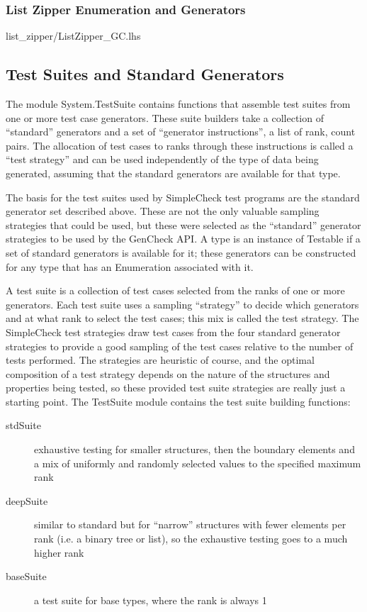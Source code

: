 \subsubsection{List Zipper Enumeration and Generators}

 {list_zipper/ListZipper_GC.lhs}
	

\subsection{Test Suites and Standard Generators}
The module System.TestSuite contains functions that assemble test suites 
from one or more test case generators. These suite builders take a collection of 
``standard'' generators and a set of ``generator instructions'', a list of rank, count pairs.  
The allocation of test cases to ranks through these instructions is called a ``test strategy'' 
and can be used independently of the type of data being generated, 
assuming that the standard generators are available for that type.

The basis for the test suites used by SimpleCheck test programs
are the standard generator set described above.
These are not the only valuable sampling strategies that could be used, but these were
selected as the ``standard'' generator strategies to be used by the GenCheck API.
A type is an instance of Testable if a set of standard generators is available for it;
these generators can be constructed for any type that has an Enumeration associated with it. 

A test suite is a collection of test cases selected from the ranks of one or more generators.
Each test suite uses a sampling ``strategy'' to decide which generators and
at what rank to select the test cases; this mix is called the test strategy.  
The SimpleCheck test strategies draw test cases from 
the four standard generator strategies to provide a good sampling 
of the test cases relative to the number of tests performed.
The strategies are heuristic of course, and the optimal composition of a test strategy
depends on the nature of the structures and properties  being tested,
so these provided test suite strategies are really just a starting point.
The TestSuite module contains the test suite building functions:

\begin{description}
\item[stdSuite] exhaustive testing for smaller structures, then the boundary elements
and a mix of uniformly and randomly selected values to the specified maximum rank 
\item[deepSuite] similar to standard but for ``narrow'' structures with fewer elements per rank
(i.e. a binary tree or list), so the exhaustive testing goes to a much higher rank
\item[baseSuite] a test suite for base types, where the rank is always 1
\end{description}

